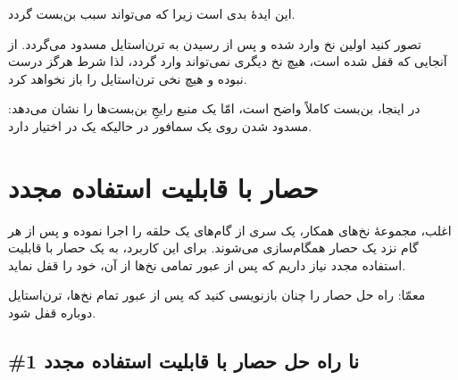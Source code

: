 \documentclass{book}
\newcommand{\clearemptydoublepage}{\newpage\cleardoublepage}
\begin{document}
    این ایدهٔ بدی است زیرا که می‌تواند سبب بن‌بست گردد. 

    تصور کنید اولین نخ وارد  شده و پس از رسیدن به تر‌ن‌استایل مسدود می‌گردد. 
    از آنجایی که  قفل شده است، هیچ نخ دیگری نمی‌تواند وارد گردد، لذا شرط 
     هرگز درست نبوده و هیچ نخی ترن‌استایل را باز نخواهد کرد. 

    در اینجا، بن‌بست کاملاً واضح است، امّا یک منبع رایجِ بن‌بست‌ها را نشان می‌دهد: مسدود شدن روی یک سمافور در حالیکه یک 
      در اختیار دارد. 

\section {حصار با قابلیت استفاده مجدد}
\label{rebar}

    اغلب، مجموعهٔ نخ‌های همکار، یک سری از گام‌های یک حلقه را اجرا نموده و پس از هر گام نزد یک حصار همگام‌سازی می‌شوند.
    برای این کاربرد، به یک حصار با قابلیت استفاده مجدد نیاز داریم که پس از عبور تمامی نخ‌ها از آن، خود را قفل نماید.  

    معمّا: راه حل حصار را چنان بازنویسی کنید که پس از عبور تمام نخ‌ها، ترن‌استایل دوباره قفل شود.

\clearemptydoublepage
\subsection { \#1 نا راه حل حصار با قابلیت استفاده مجدد}
\end{document}
